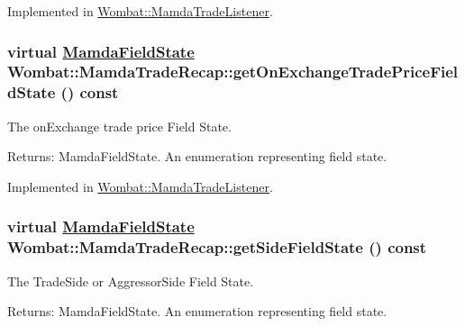 Implemented in \hyperlink{classWombat_1_1MamdaTradeListener_7939de727c94506247b065996e9ef1b5}{Wombat::Mamda\-Trade\-Listener}.\hypertarget{classWombat_1_1MamdaTradeRecap_f64ddeb0f184484bab7fcb380995b6a5}{
\subsubsection[getOnExchangeTradePriceFieldState]{\setlength{\rightskip}{0pt plus 5cm}virtual \hyperlink{namespaceWombat_93aac974f2ab713554fd12a1fa3b7d2a}{Mamda\-Field\-State} Wombat::Mamda\-Trade\-Recap::get\-On\-Exchange\-Trade\-Price\-Field\-State () const}}
\label{classWombat_1_1MamdaTradeRecap_f64ddeb0f184484bab7fcb380995b6a5}


The on\-Exchange trade price Field State. 

\begin{Desc}
\item[Returns:]Mamda\-Field\-State. An enumeration representing field state. \end{Desc}


Implemented in \hyperlink{classWombat_1_1MamdaTradeListener_d197007dd685e6240a89ad4729c62352}{Wombat::Mamda\-Trade\-Listener}.\hypertarget{classWombat_1_1MamdaTradeRecap_69f58e9304fcfeedd22b8e9067c6b47a}{
\subsubsection[getSideFieldState]{\setlength{\rightskip}{0pt plus 5cm}virtual \hyperlink{namespaceWombat_93aac974f2ab713554fd12a1fa3b7d2a}{Mamda\-Field\-State} Wombat::Mamda\-Trade\-Recap::get\-Side\-Field\-State () const}}
\label{classWombat_1_1MamdaTradeRecap_69f58e9304fcfeedd22b8e9067c6b47a}


The Trade\-Side or Aggressor\-Side Field State. 

\begin{Desc}
\item[Returns:]Mamda\-Field\-State. An enumeration representing field state. \end{Desc}


